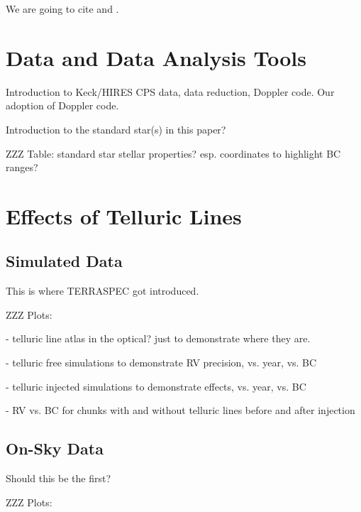 \documentclass{emulateapj}
\begin{document}
\begin{CJK*}{UTF8}{gbsn}
We are going to cite \cite{artigau2014, cunha2014} and \cite{hitran2013}.


\section{Data and Data Analysis Tools}\label{sec:data}

Introduction to Keck/HIRES CPS data, data reduction, Doppler code. Our
adoption of Doppler code.

Introduction to the standard star(s) in this paper?

ZZZ Table: standard star stellar properties? esp. coordinates to
highlight BC ranges?


\section{Effects of Telluric Lines}\label{sec:effects}


\subsection{Simulated Data}

This is where TERRASPEC got introduced.

ZZZ Plots:

- telluric line atlas in the optical? just to demonstrate where they are.

- telluric free simulations to demonstrate RV precision, vs. year,
vs. BC

- telluric injected simulations to demonstrate effects, vs. year, vs. BC

- RV vs. BC for chunks with and without telluric lines before and
after injection


\subsection{On-Sky Data}

Should this be the first?

ZZZ Plots:


\end{CJK*}
\end{document}
